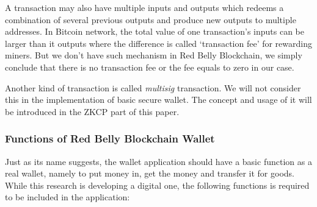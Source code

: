 \documentclass[12pt]{article}
\begin{document}
A transaction may also have multiple inputs and outputs which redeems a combination of several previous outputs and produce new outputs to multiple addresses. In Bitcoin network, the total value of one transaction's inputs can be larger than it outputs where the difference is called `transaction fee' for rewarding miners. But we don't have such mechanism in Red Belly Blockchain, we simply conclude that there is no transaction fee or the fee equals to zero in our case.

Another kind of transaction is called \textit{multisig} transaction. We will not consider this in the implementation of basic secure wallet. The concept and usage of it will be introduced in the ZKCP part of this paper.

\subsubsection{Functions of Red Belly Blockchain Wallet}

Just as its name suggests, the wallet application should have a basic function as a real wallet, namely to put money in, get the money and transfer it for goods. While this research is developing a digital one, the following functions is required to be included in the application:
\end{document}
